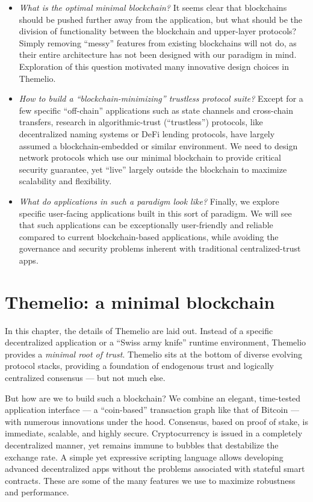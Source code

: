 \documentclass[headinclude,12pt]{scrbook}
\begin{document}
\begin{itemize}
    \item \textit{What is the optimal minimal blockchain?} It seems clear that blockchains should be pushed further away from the application, but what should be the division of functionality between the blockchain and upper-layer protocols? Simply removing ``messy'' features from existing blockchains will not do, as their entire architecture has not been designed with our paradigm in mind. Exploration of this question motivated many innovative design choices in Themelio.
    \item \textit{How to build a ``blockchain-minimizing'' trustless protocol suite?} Except for a few specific ``off-chain'' applications such as state channels and cross-chain transfers, research in algorithmic-trust (``trustless'') protocols, like decentralized naming systems or DeFi lending protocols, have largely assumed a blockchain-embedded or similar environment. We need to design network protocols which use our minimal blockchain to provide critical security guarantee, yet ``live'' largely outside the blockchain to maximize scalability and flexibility.
    \item \textit{What do applications in such a paradigm look like?} Finally, we explore specific user-facing applications built in this sort of paradigm. We will see that such applications can be exceptionally user-friendly and reliable compared to current blockchain-based applications, while avoiding the governance and security problems inherent with traditional centralized-trust apps.
\end{itemize}


\chapter{Themelio: a minimal blockchain}

In this chapter, the details of Themelio are laid out. Instead of a specific decentralized application or a ``Swiss army knife'' runtime environment, Themelio provides a \emph{minimal root of trust}. Themelio sits at the bottom of diverse evolving protocol stacks, providing a foundation of endogenous trust and logically centralized consensus --- but not much else.

But how are we to build such a blockchain? We combine an elegant, time-tested application interface --- a ``coin-based'' transaction graph like that of Bitcoin --- with numerous innovations under the hood. Consensus, based on proof of stake, is immediate, scalable, and highly secure. Cryptocurrency is issued in a completely decentralized manner, yet remains immune to bubbles that destabilize the exchange rate. A simple yet expressive scripting language allows developing advanced decentralized apps without the problems associated with stateful smart contracts. These are some of the many features we use to maximize robustness and performance.
\end{document}
